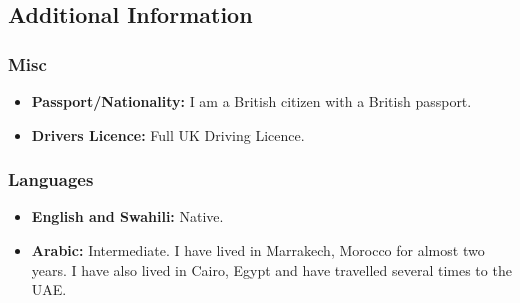 \documentclass[
  a4paper,
  8pt,
]{article}
\providecommand{\tightlist}{%
  \setlength{\itemsep}{0pt}\setlength{\parskip}{0pt}}
\begin{document}
\begin{multicols}{2}
\hypertarget{additional-information}{%
\subsection{Additional Information}\label{additional-information}}

\hypertarget{misc}{%
\subsubsection{Misc}\label{misc}}

\begin{itemize}
\tightlist
\item
  \textbf{Passport/Nationality:} I am a British citizen with a British
  passport.
\item
  \textbf{Drivers Licence:} Full UK Driving Licence.
\end{itemize}

\hypertarget{languages}{%
\subsubsection{Languages}\label{languages}}

\begin{itemize}
\tightlist
\item
  \textbf{English and Swahili:} Native.
\item
  \textbf{Arabic:} Intermediate. I have lived in Marrakech, Morocco for
  almost two years. I have also lived in Cairo, Egypt and have travelled
  several times to the UAE.
\end{itemize}

\end{multicols}
\end{document}
